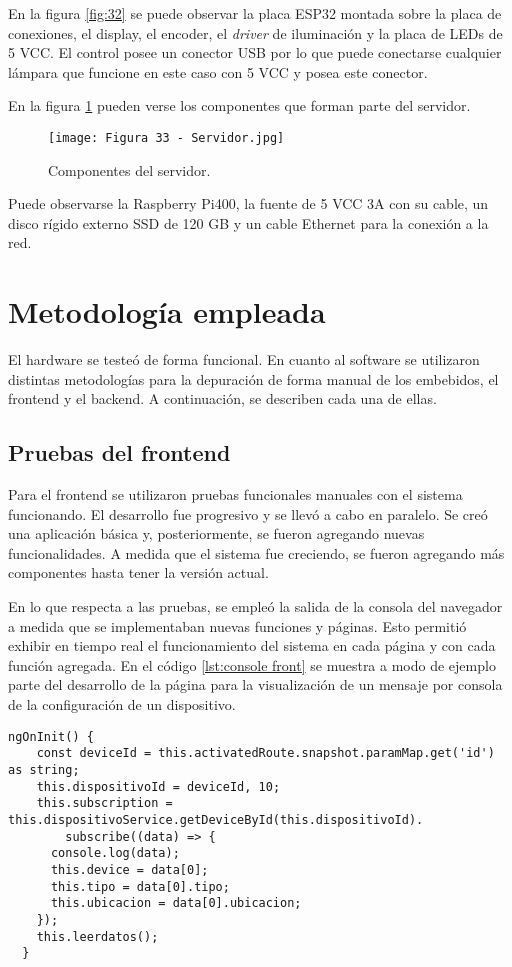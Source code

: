 En la figura  \ref{fig:32} se puede observar la placa ESP32 montada sobre la placa de conexiones, el display, el encoder, el \textit{driver} de iluminación y la placa de LEDs de 5 VCC. El control posee un conector USB por lo que puede conectarse cualquier lámpara que funcione en este caso con 5 VCC y posea este conector.

En la figura \ref{fig:33} pueden verse los componentes que forman parte del servidor.

\begin{figure}[h]
\centering
\texttt{[image: Figura 33 - Servidor.jpg]}
\caption[Componentes del servidor]{Componentes del servidor.}
\label{fig:33}
\end{figure}

Puede observarse la Raspberry Pi400, la fuente de 5 VCC 3A con su cable, un disco rígido externo SSD de 120 GB y un cable Ethernet para la conexión a la red.

\section{Metodología empleada}

El hardware se testeó de forma funcional. En cuanto al software se utilizaron distintas metodologías para la depuración de forma manual de los embebidos, el frontend y el backend. A continuación, se describen cada una de ellas.

\subsection{Pruebas del frontend}

Para el frontend se utilizaron pruebas funcionales manuales con el sistema funcionando. El desarrollo fue progresivo y se llevó a cabo en paralelo. Se creó una aplicación básica y, posteriormente, se fueron agregando nuevas funcionalidades. A medida que el sistema fue creciendo, se fueron agregando más componentes hasta tener la versión actual.

En lo que respecta a las pruebas, se empleó la salida de la consola del navegador a medida que se implementaban nuevas funciones y páginas. Esto permitió exhibir en tiempo real el funcionamiento del sistema en cada página y con cada función agregada. En el código \ref{lst:console front} se muestra a modo de ejemplo parte del desarrollo de la página para la visualización de un mensaje por consola de la configuración de un dispositivo.

\begin{lstlisting}[caption={Muestra por consola de los datos recibidos.}, label={lst:console front}]
ngOnInit() {
    const deviceId = this.activatedRoute.snapshot.paramMap.get('id') as string;
    this.dispositivoId = deviceId, 10;
    this.subscription = this.dispositivoService.getDeviceById(this.dispositivoId).
   		subscribe((data) => {
      console.log(data);
      this.device = data[0];
      this.tipo = data[0].tipo;
      this.ubicacion = data[0].ubicacion;
    });
    this.leerdatos();
  }
\end{lstlisting}

